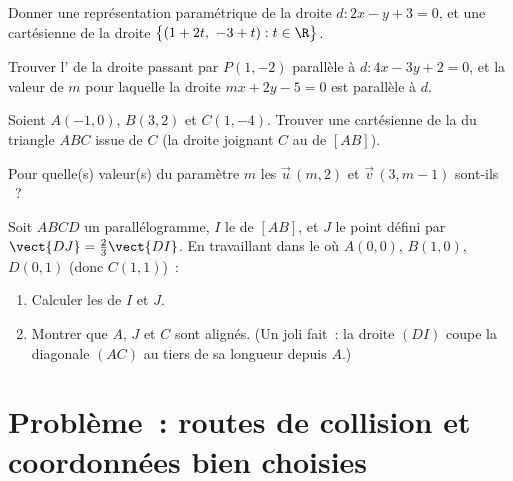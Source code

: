 \begin{exercise}[$\star\star$]\label{exo:g11:vect:7}
Donner une représentation paramétrique de la droite
$d: 2x - y + 3 = 0$, et une  cartésienne de la droite
$\bigl\{(1 + 2t,\ -3 + t) : t \in \R\bigr\}$.
\end{exercise}

\begin{exercise}[$\star\star$]\label{exo:g11:vect:8}
Trouver l' de la droite passant par $P(1, -2)$ parallèle à
$d: 4x - 3y + 2 = 0$, et la valeur de $m$ pour laquelle la droite
$mx + 2y - 5 = 0$ est parallèle à $d$.
\end{exercise}

\begin{exercise}[$\star\star$]\label{exo:g11:vect:9}
Soient $A(-1, 0)$, $B(3, 2)$ et $C(1, -4)$. Trouver une 
cartésienne de la \emph{} du triangle $ABC$ issue de $C$ (la
droite joignant $C$ au  de $[AB]$).
\end{exercise}

\begin{exercise}[$\star\star$]\label{exo:g11:vect:10}
Pour quelle(s) valeur(s) du paramètre $m$ les  $\vec u\,(m, 2)$
et $\vec v\,(3, m - 1)$ sont-ils ~?
\end{exercise}

\begin{exercise}[$\star\star\star$]\label{exo:g11:vect:11}
Soit $ABCD$ un parallélogramme, $I$ le  de $[AB]$, et $J$ le point
défini par $\vect{DJ} = \frac23 \vect{DI}$. En travaillant dans le
 où $A(0,0)$, $B(1,0)$, $D(0,1)$ (donc $C(1,1)$)~:
\begin{enumerate}
  \item Calculer les  de $I$ et $J$.
  \item Montrer que $A$, $J$ et $C$ sont alignés. (Un joli fait~: la
        droite $(DI)$ coupe la diagonale $(AC)$ au tiers de sa longueur
        depuis $A$.)
\end{enumerate}
\end{exercise}

\section{Problème~: routes de collision et coordonnées bien choisies}

